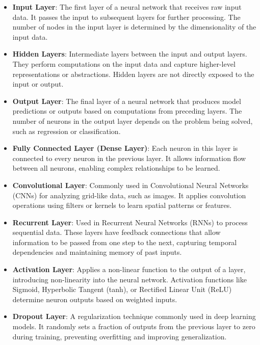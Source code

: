 \begin{itemize}
    \begin{itemize}
        \item \textbf{Input Layer}: The first layer of a neural network that receives raw input data. It passes the input to subsequent layers for further processing. The number of nodes in the input layer is determined by the dimensionality of the input data.
    
        \item \textbf{Hidden Layers}: Intermediate layers between the input and output layers. They perform computations on the input data and capture higher-level representations or abstractions. Hidden layers are not directly exposed to the input or output.
        
        \item \textbf{Output Layer}: The final layer of a neural network that produces model predictions or outputs based on computations from preceding layers. The number of neurons in the output layer depends on the problem being solved, such as regression or classification.
        
        \item \textbf{Fully Connected Layer (Dense Layer)}: Each neuron in this layer is connected to every neuron in the previous layer. It allows information flow between all neurons, enabling complex relationships to be learned.
        
        \item \textbf{Convolutional Layer}: Commonly used in Convolutional Neural Networks (CNNs) for analyzing grid-like data, such as images. It applies convolution operations using filters or kernels to learn spatial patterns or features.
        
        \item \textbf{Recurrent Layer}: Used in Recurrent Neural Networks (RNNs) to process sequential data. These layers have feedback connections that allow information to be passed from one step to the next, capturing temporal dependencies and maintaining memory of past inputs.
        
        \item \textbf{Activation Layer}: Applies a non-linear function to the output of a layer, introducing non-linearity into the neural network. Activation functions like Sigmoid, Hyperbolic Tangent (tanh), or Rectified Linear Unit (ReLU) determine neuron outputs based on weighted inputs.
        
        \item \textbf{Dropout Layer}: A regularization technique commonly used in deep learning models. It randomly sets a fraction of outputs from the previous layer to zero during training, preventing overfitting and improving generalization.
    \end{itemize}
    

\end{itemize}
